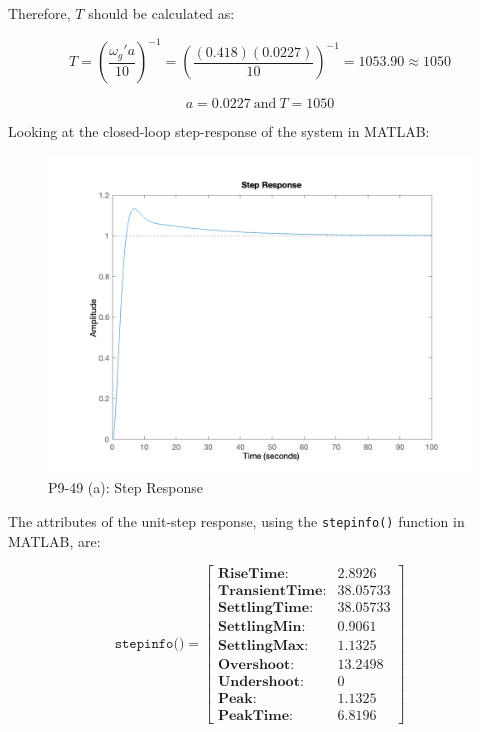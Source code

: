\documentclass[12pt, letterpaper]{../assignment}
\begin{document}
Therefore, $T$ should be calculated as:

$$ T = \left(\frac{\omega_g' a}{10}\right)^{-1}
     = \left(\frac{(0.418)(0.0227)}{10}\right)^{-1}
     = 1053.90 \approx 1050$$

\begin{answer}
    $$ a = 0.0227  \ \text{and} \ T = 1050 $$
\end{answer}

Looking at the closed-loop step-response of the system in MATLAB:

\begin{figure}[H]
    \centering
    \includegraphics[width=1\linewidth]{./figures/step_9_49a.png}
    \caption{P9-49 (a): Step Response}
\end{figure}

The attributes of the unit-step response,
using the \texttt{stepinfo()} function in MATLAB, are:

\begin{answer}
$$ \texttt{stepinfo()} =  \left[
\begin{array}{rl}
    \textbf{RiseTime:}& 2.8926\\
    \textbf{TransientTime:}& 38.05733\\
    \textbf{SettlingTime:}& 38.05733\\
    \textbf{SettlingMin:}& 0.9061\\
    \textbf{SettlingMax:}& 1.1325\\
    \textbf{Overshoot:}& 13.2498\\
    \textbf{Undershoot:}& 0\\
    \textbf{Peak:}& 1.1325\\
    \textbf{PeakTime:}& 6.8196
\end{array} \right] $$
\end{answer}
\end{document}
